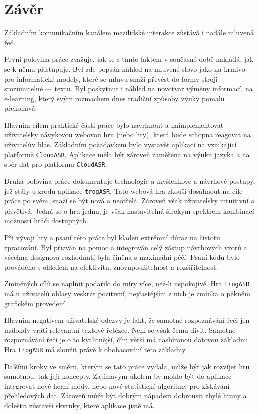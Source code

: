 \chapter*{Závěr}

Základním komunikačním kanálem mezilidské interakce zůstává i nadále mluvená řeč.

První polovina práce zvažuje, jak se s tímto faktem v současné době nakládá, jak se k němu přistupuje. Byl zde popsán náhled na mluvené slovo jako na krmivo pro informatické modely, které se mluvu snaží převést do formy stroji srozumitelné --- textu. Byl poskytnut i náhled na novotvar výměny informací, na e-learning, který svým rozmachem dnes tradiční způsoby výuky pomalu překonává.

Hlavním cílem praktické části práce bylo navrhnout a naimplementovat uživatelsky návykovou webovou hru (nebo hry), která bude schopna reagovat na uživatelův hlas. Základním požadavkem bylo vystavět aplikaci na vznikající platformě \verb|CloudASR|. Aplikace měla být zároveň zaměřena na výuku jazyka a na sběr dat pro platformu \verb|CloudASR|.

Druhá polovina práce dokumentuje technologie a myšlenkové a návrhové postupy, jež stály u zrodu aplikace \verb|trogASR|. Tato webová hra zkouší dosáhnout na cíle práce po svém, snaží se být nová a neotřelá. Zároveň však uživatelsky intuitivní a přívětivá. Jedná se o hru jednu, je však nastavitelná širokým spektrem kombinací možností hráči dostupných.

Při vývoji hry a psaní této práce byl kladen extrémní důraz na čistotu zpracování. Byl přizván na pomoc a integrován celý zástup návrhových vzorů a všechna designová rozhodnutí byla činěna s maximální péčí. Psaní kódu bylo prováděno s ohledem na efektivitu, znovupoužitelnost a rozšiřitelnost.

Zmíněných cílů se naplnit podařilo do míry více, než-li uspokojivé. Hra \verb|trogASR| má u uživatelů ohlasy veskrze pozitivní, nejčastějším z nich je zmínka o pěkném grafickém provedení.

Hlavním negativem uživatelské odezvy je fakt, že samotné rozpoznávání řeči jen málokdy vrátí relevantní textové řetězce. Není se však čemu divit. Samotné rozpoznávání řeči je o to kvalitnější, čím větší má nasbíranou datovou základnu. Hra \verb|trogASR| má sloužit právě k obohacování této základny.

Dalšími kroky ve směru, kterým se tato práce vydala, může být jak rozvíjet hru samotnou, tak její koncepty. Zajímavým úkolem by mohlo být do aplikace integrovat nové herní módy, nebo nové statistické algoritmy pro získávání přehledových dat. Zároveň může být dobrým nápadem dobrousit zbylé hrany a doleštit zůstavší skvrnky, které aplikace jistě má.